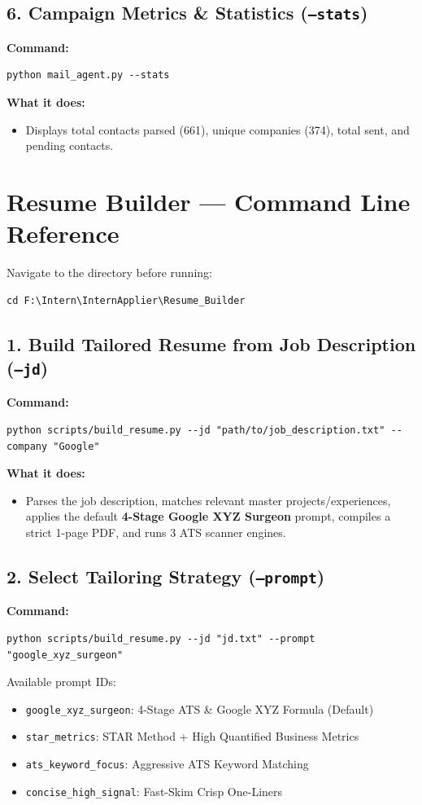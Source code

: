\documentclass[11pt,a4paper]{article}
\begin{document}
\subsection{6. Campaign Metrics \& Statistics (\texttt{--stats})}
\textbf{Command:}
\begin{verbatim}
python mail_agent.py --stats
\end{verbatim}
\textbf{What it does:}
\begin{itemize}[leftmargin=14pt, itemsep=1pt]
    \item Displays total contacts parsed (661), unique companies (374), total sent, and pending contacts.
\end{itemize}

\vspace{8pt}

\section{Resume Builder — Command Line Reference}
Navigate to the directory before running:
\begin{verbatim}
cd F:\Intern\InternApplier\Resume_Builder
\end{verbatim}

\subsection{1. Build Tailored Resume from Job Description (\texttt{--jd})}
\textbf{Command:}
\begin{verbatim}
python scripts/build_resume.py --jd "path/to/job_description.txt" --company "Google"
\end{verbatim}
\textbf{What it does:}
\begin{itemize}[leftmargin=14pt, itemsep=1pt]
    \item Parses the job description, matches relevant master projects/experiences, applies the default \textbf{4-Stage Google XYZ Surgeon} prompt, compiles a strict 1-page PDF, and runs 3 ATS scanner engines.
\end{itemize}

\subsection{2. Select Tailoring Strategy (\texttt{--prompt})}
\textbf{Command:}
\begin{verbatim}
python scripts/build_resume.py --jd "jd.txt" --prompt "google_xyz_surgeon"
\end{verbatim}
Available prompt IDs:
\begin{itemize}[leftmargin=14pt, itemsep=1pt]
    \item \texttt{google\_xyz\_surgeon}: 4-Stage ATS \& Google XYZ Formula (Default)
    \item \texttt{star\_metrics}: STAR Method + High Quantified Business Metrics
    \item \texttt{ats\_keyword\_focus}: Aggressive ATS Keyword Matching
    \item \texttt{concise\_high\_signal}: Fast-Skim Crisp One-Liners
\end{itemize}
\end{document}
